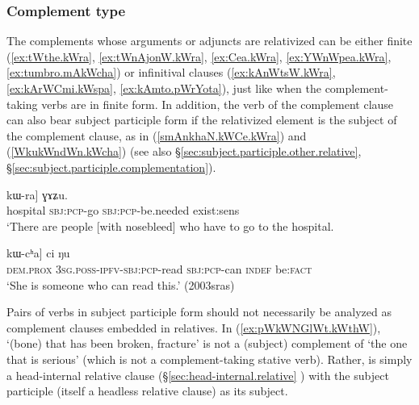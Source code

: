  
\subsubsection{Complement type} \label{sec:relativization.complement.type}
The complements whose arguments or adjuncts are relativized can be either finite (\ref{ex:tWthe.kWra}, \ref{ex:tWnAjonW.kWra}, \ref{ex:Cea.kWra}, \ref{ex:YWnWpea.kWra}, \ref{ex:tumbro.mAkWcha}) or infinitival clauses (\ref{ex:kAnWtsW.kWra}, \ref{ex:kArWCmi.kWspa}, \ref{ex:kAmto.pWrYota}), just like when the complement-taking verbs are in finite form. In addition, the verb of the complement clause can also bear subject participle form if the relativized element is the subject of the complement clause, as in (\ref{smAnkhaN.kWCe.kWra}) and (\ref{WkukWndWn.kWcha}) (see also §\ref{sec:subject.participle.other.relative}, §\ref{sec:subject.participle.complementation}).

\begin{exe}
\ex \label{smAnkhaN.kWCe.kWra}
\gll  [[smɤnkʰaŋ kɯ-ɕe] kɯ-ra] ɣɤʑu. \\
hospital \textsc{sbj}:\textsc{pcp}-go \textsc{sbj}:\textsc{pcp}-be.needed exist:sens \\
\glt `There are people [with nosebleed] who have to go to the hospital. \\
\end{exe}
 
\begin{exe}
\ex \label{WkukWndWn.kWcha}
\gll  [[kɯki ɯ-ku-kɯ-ndɯn] kɯ-cʰa] ci ŋu \\
\textsc{dem}.\textsc{prox} \textsc{3sg}.\textsc{poss}-\textsc{ipfv}-\textsc{sbj}:\textsc{pcp}-read \textsc{sbj}:\textsc{pcp}-can \textsc{indef} be:\textsc{fact} \\
\glt `She is someone who can read this.' (2003sras)
\end{exe}

Pairs of verbs in subject participle form should not necessarily be analyzed as complement clauses embedded in relatives. In (\ref{ex:pWkWNGlWt.kWthW}),  `(bone) that has been broken, fracture' is not a (subject) complement of   `the one that is serious' (which is not a complement-taking stative verb). Rather,  is simply a head-internal relative clause (§\ref{sec:head-internal.relative} ) with the subject participle (itself a headless relative clause)  as its subject. 

